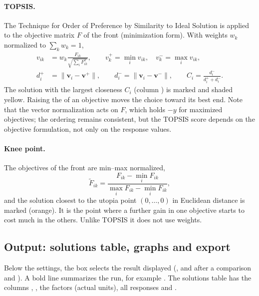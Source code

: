 \paragraph{TOPSIS.} The Technique for Order of Preference by Similarity to Ideal Solution \citep{hwang1981} is
applied to the objective matrix $F$ of the front (minimization form). With weights $w_k$ normalized to
$\sum_k w_k=1$,
\begin{align}
v_{ik}&=w_k\frac{F_{ik}}{\sqrt{\sum_i F_{ik}^2}},\qquad v_k^+=\min_i v_{ik},\quad v_k^-=\max_i v_{ik},\nonumber\\
d_i^+&=\|\mathbf v_i-\mathbf v^+\|,\qquad d_i^-=\|\mathbf v_i-\mathbf v^-\|,\qquad
C_i=\frac{d_i^-}{d_i^++d_i^-}.
\label{eq:ch08-topsis}
\end{align}
The solution with the largest closeness $C_i$ (column ) is marked  and
shaded yellow. Raising the  of an objective moves the choice toward its best end. Note that the
vector normalization acts on $F$, which holds $-y$ for maximized objectives; the ordering remains consistent, but
the TOPSIS score depends on the objective formulation, not only on the response values.

\paragraph{Knee point.} The objectives of the front are min--max normalized,
\begin{equation}
\tilde F_{ik}=\frac{F_{ik}-\min_i F_{ik}}{\max_i F_{ik}-\min_i F_{ik}},
\label{eq:ch08-knee}
\end{equation}
and the solution closest to the utopia point $(0,\dots,0)$ in Euclidean distance is marked  (orange). It is the point where a further
gain in one objective starts to cost much in the others. Unlike TOPSIS it does not use weights.

\subsection{Output: solutions table, graphs and export}
Below the settings, the  box selects the result displayed (, and after a
comparison  and ). A bold line summarizes the run, for example
. The solutions
table has the columns , , the factors (actual units), all responses and .

